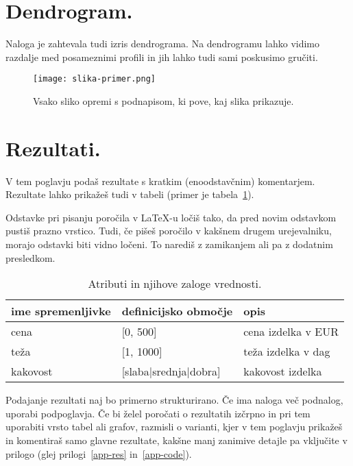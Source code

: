 \documentclass[a4paper,11pt]{article}
\begin{document}
\section{Dendrogram.}
Naloga je zahtevala tudi izris dendrograma. Na dendrogramu lahko vidimo razdalje med posameznimi profili in jih lahko tudi sami poskusimo gručiti.

\begin{figure}[htbp]
\begin{center}
\texttt{[image: slika-primer.png]}
\caption{Vsako sliko opremi s podnapisom, ki pove, kaj slika prikazuje.}
\label{slika1}
\end{center}
\end{figure}


\section{Rezultati.}

V tem poglavju podaš rezultate s kratkim (enoodstavčnim)
komentarjem. Rezultate lahko prikažeš tudi v tabeli (primer je
tabela~\ref{tab1}).

Odstavke pri pisanju poročila v LaTeX-u ločiš tako, da pred novim
odstavkom pustiš prazno vrstico. Tudi, če pišeš poročilo v kakšnem
drugem urejevalniku, morajo odstavki biti vidno ločeni. To narediš z
zamikanjem ali pa z dodatnim presledkom.

\begin{table}[htbp]
\caption{Atributi in njihove zaloge vrednosti.}
\label{tab1}
\begin{center}
\begin{tabular}{llp{3cm}}
\hline
ime spremenljivke & definicijsko območje & opis \\
\hline
cena & [0, 500] & cena izdelka v EUR\\
teža & [1, 1000] & teža izdelka v dag \\
kakovost & [slaba|srednja|dobra] & kakovost izdelka \\
\hline
\end{tabular}
\end{center}
\end{table}

Podajanje rezultati naj bo primerno strukturirano. Če ima naloga več
podnalog, uporabi podpoglavja. Če bi želel poročati o rezultatih
izčrpno in pri tem uporabiti vrsto tabel ali grafov, razmisli o
varianti, kjer v tem poglavju prikažeš in komentiraš samo glavne
rezultate, kakšne manj zanimive detajle pa vključite v prilogo (glej
prilogi~\ref{app-res} in~\ref{app-code}).
\end{document}
